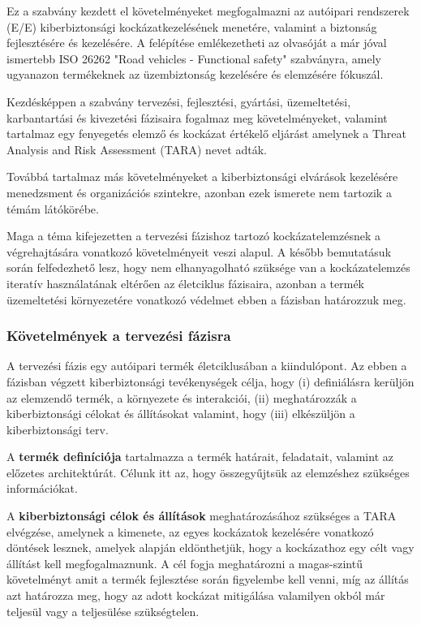 Ez a szabvány kezdett el követelményeket megfogalmazni az autóipari rendszerek (E/E) kiberbiztonsági kockázatkezelésének menetére, valamint a biztonság fejlesztésére és kezelésére. A felépítése emlékezetheti az olvasóját a már jóval ismertebb ISO 26262 "Road vehicles - Functional safety" szabványra, amely ugyanazon termékeknek az üzembiztonság kezelésére és elemzésére fókuszál.

Kezdésképpen a szabvány tervezési, fejlesztési, gyártási, üzemeltetési, karbantartási és kivezetési fázisaira fogalmaz meg követelményeket, valamint tartalmaz egy fenyegetés elemző és kockázat értékelő eljárást amelynek a Threat Analysis and Risk Assessment (TARA) nevet adták.

Továbbá tartalmaz más követelményeket a kiberbiztonsági elvárások kezelésére menedzsment és organizációs szintekre, azonban ezek ismerete nem tartozik a témám látókörébe.

Maga a téma kifejezetten a tervezési fázishoz tartozó kockázatelemzésnek a végrehajtására vonatkozó követelményeit veszi alapul. A később bemutatásuk során felfedezhető lesz, hogy nem elhanyagolható szüksége van a kockázatelemzés iteratív használatának eltérően az életciklus fázisaira, azonban a termék üzemeltetési környezetére vonatkozó védelmet ebben a fázisban határozzuk meg.

\subsubsection{Követelmények a tervezési fázisra}
A tervezési fázis egy autóipari termék életciklusában a kiindulópont. Az ebben a fázisban végzett kiberbiztonsági tevékenységek célja, hogy (i) definiálásra kerüljön az elemzendő termék, a környezete és interakciói, (ii) meghatározzák a kiberbiztonsági célokat és állításokat valamint, hogy (iii) elkészüljön a kiberbiztonsági terv.

A \textbf{termék definíciója} tartalmazza a termék határait, feladatait, valamint az előzetes architektúrát. Célunk itt az, hogy összegyűjtsük az elemzéshez szükséges információkat.

A \textbf{kiberbiztonsági célok és állítások} meghatározásához szükséges a TARA elvégzése, amelynek a kimenete, az egyes kockázatok kezelésére vonatkozó döntések lesznek, amelyek alapján eldönthetjük, hogy a kockázathoz egy célt vagy állítást kell megfogalmaznunk. A cél fogja meghatározni a magas-szintű követelményt amit a termék fejlesztése során figyelembe kell venni, míg az állítás azt határozza meg, hogy az adott kockázat mitigálása valamilyen okból már teljesül vagy a teljesülése szükségtelen.

